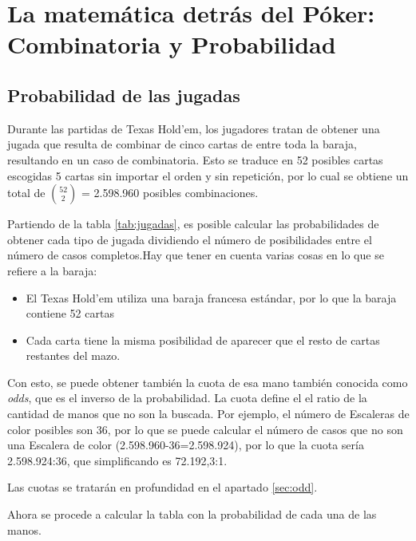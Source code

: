 \chapter{La matemática detrás del Póker: Combinatoria y Probabilidad}

\section{Probabilidad de las jugadas}
\label{sec:prob_jug}

Durante las partidas de Texas Hold’em, los jugadores tratan de obtener una jugada que resulta de combinar de cinco cartas de entre toda la baraja, resultando en un caso de combinatoria. Esto se traduce en 52 posibles cartas escogidas 5 cartas sin importar el orden y sin repetición, por lo cual se obtiene un total de $\binom{52}{2}$ = 2.598.960 posibles combinaciones. 

Partiendo de la tabla \ref{tab:jugadas}, es posible calcular las probabilidades de obtener cada tipo de jugada dividiendo el número de posibilidades entre el número de casos completos.Hay que tener en cuenta varias cosas en lo que se refiere a la baraja:
\begin{itemize}
\item El Texas Hold'em utiliza una baraja francesa estándar, por lo que la baraja contiene 52 cartas
\item Cada carta tiene la misma posibilidad de aparecer que el resto de cartas restantes del mazo.
\end{itemize}

Con esto, se puede obtener también la cuota de esa mano también conocida como \textit{odds}, que es el inverso de la probabilidad. La cuota define el el ratio de la cantidad de manos que no son la buscada.
Por ejemplo, el número de Escaleras de color posibles son 36, por lo que se puede calcular el número de casos que no son una Escalera de color (2.598.960-36=2.598.924), por lo que la cuota sería 2.598.924:36, que simplificando es 72.192,3:1.

Las cuotas se tratarán en profundidad en el apartado \ref{sec:odd}.

Ahora se procede a calcular la tabla con la probabilidad de cada una de las manos.

